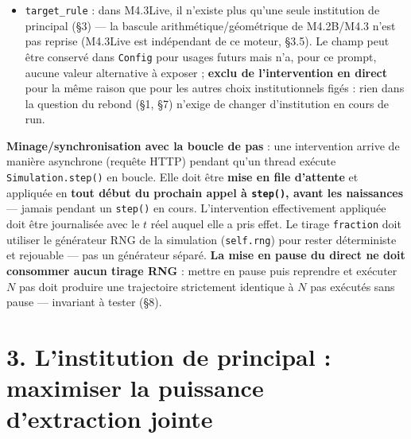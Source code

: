 \documentclass[11pt,a4paper]{article}
\newcommand{\code}[1]{\texttt{#1}}
\begin{document}
\begin{itemize}
  population/marché, pas des attributs d'entité --- \code{new} doit être
  un alias explicite de \code{all} (documenté comme tel dans l'IHM, pas
  masqué), \code{fraction} n'a pas de sens (pas d'implémentation
  requise). Ceci ne les exclut pas comme axes secondaires de
  l'\textbf{expérience} du \S7 elle-même --- des jeux différents de ces
  paramètres, donc des régimes de population/marché différents, peuvent
  être intéressants à observer pour la question du rebond (remarque de
  l'utilisateur) ; seule l'extension de la sémantique de portée
  fraction/new à ces paramètres est hors mandat.
\item \code{target\_rule} : dans M4.3Live, il n'existe plus qu'une seule
  institution de principal (\S3) --- la bascule arithmétique/géométrique
  de M4.2B/M4.3 n'est pas reprise (M4.3Live est indépendant de ce
  moteur, \S3.5). Le champ peut être conservé dans \code{Config} pour
  usages futurs mais n'a, pour ce prompt, aucune valeur alternative à
  exposer ; \textbf{exclu de l'intervention en direct} pour la même
  raison que pour les autres choix institutionnels figés : rien dans la
  question du rebond (\S1, \S7) n'exige de changer d'institution en
  cours de run.
\end{itemize}

\textbf{Minage/synchronisation avec la boucle de pas} : une intervention
arrive de manière asynchrone (requête HTTP) pendant qu'un thread exécute
\code{Simulation.step()} en boucle. Elle doit être \textbf{mise en file
d'attente} et appliquée en \textbf{tout début du prochain appel à
\code{step()}, avant les naissances} --- jamais pendant un \code{step()}
en cours. L'intervention effectivement appliquée doit être journalisée
avec le $t$ réel auquel elle a pris effet. Le tirage \code{fraction}
doit utiliser le générateur RNG de la simulation (\code{self.rng}) pour
rester déterministe et rejouable --- pas un générateur séparé.
\textbf{La mise en pause du direct ne doit consommer aucun tirage RNG} :
mettre en pause puis reprendre et exécuter $N$ pas doit produire une
trajectoire strictement identique à $N$ pas exécutés sans pause ---
invariant à tester (\S8).

\section*{3. L'institution de principal : maximiser la puissance d'extraction jointe}
\end{document}

